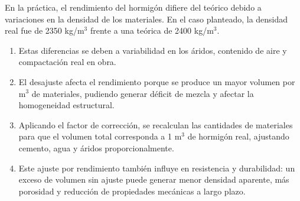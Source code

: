 En la práctica, el rendimiento del hormigón difiere del teórico debido a variaciones en la densidad de los materiales. En el caso planteado, la densidad real fue de 2350 kg/m\(^3\) frente a una teórica de 2400 kg/m\(^3\).
\begin{enumerate}
    \item Estas diferencias se deben a variabilidad en los áridos, contenido de aire y compactación real en obra.
    \item El desajuste afecta el rendimiento porque se produce un mayor volumen por m\(^3\) de materiales, pudiendo generar déficit de mezcla y afectar la homogeneidad estructural.
    \item Aplicando el factor de corrección, se recalculan las cantidades de materiales para que el volumen total corresponda a 1 m\(^3\) de hormigón real, ajustando cemento, agua y áridos proporcionalmente.
    \item Este ajuste por rendimiento también influye en resistencia y durabilidad: un exceso de volumen sin ajuste puede generar menor densidad aparente, más porosidad y reducción de propiedades mecánicas a largo plazo.
\end{enumerate}
